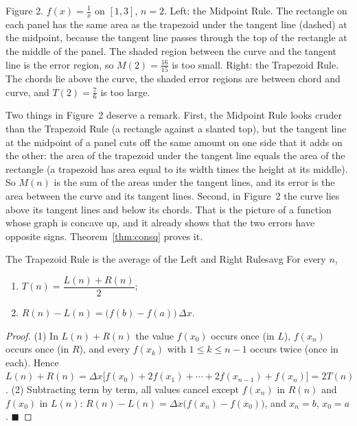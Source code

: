 \documentclass[11pt]{article}
\begin{document}
\begin{center}\small Figure 2. $f(x)=\frac1x$ on $[1,3]$, $n=2$. Left: the Midpoint Rule. The rectangle on each panel has the same area as the trapezoid under the tangent line (dashed) at the midpoint, because the tangent line passes through the top of the rectangle at the middle of the panel. The shaded region between the curve and the tangent line is the error region, so $M(2)=\frac{16}{15}$ is too small. Right: the Trapezoid Rule. The chords lie above the curve, the shaded error regions are between chord and curve, and $T(2)=\frac76$ is too large.\end{center}

Two things in Figure~2 deserve a remark. First, the Midpoint Rule looks cruder than the Trapezoid Rule (a rectangle against a slanted top), but the tangent line at the midpoint of a panel cuts off the same amount on one side that it adds on the other: the area of the trapezoid under the tangent line equals the area of the rectangle (a trapezoid has area equal to its width times the height at its middle). So $M(n)$ is the sum of the areas under the tangent lines, and its error is the area between the curve and its tangent lines. Second, in Figure~2 the curve lies above its tangent lines and below its chords. That is the picture of a function whose graph is concave up, and it already shows that the two errors have opposite signs. Theorem~\ref{thm:consq} proves it.

\begin{thm}{The Trapezoid Rule is the average of the Left and Right Rules}{avg}
For every $n$,
\begin{enumerate}[label=(\arabic*),leftmargin=*]
  \item $T(n)=\dfrac{L(n)+R(n)}2$;
  \item $R(n)-L(n)=\big(f(b)-f(a)\big)\,\Delta x$.
\end{enumerate}
\end{thm}
\begin{proof}
(1) In $L(n)+R(n)$ the value $f(x_0)$ occurs once (in $L$), $f(x_n)$ occurs once (in $R$), and every $f(x_k)$ with $1\le k\le n-1$ occurs twice (once in each). Hence $L(n)+R(n)=\Delta x\big[f(x_0)+2f(x_1)+\cdots+2f(x_{n-1})+f(x_n)\big]=2T(n)$. (2) Subtracting term by term, all values cancel except $f(x_n)$ in $R(n)$ and $f(x_0)$ in $L(n)$: $R(n)-L(n)=\Delta x\big(f(x_n)-f(x_0)\big)$, and $x_n=b$, $x_0=a$. $\blacksquare$
\end{proof}
\end{document}
